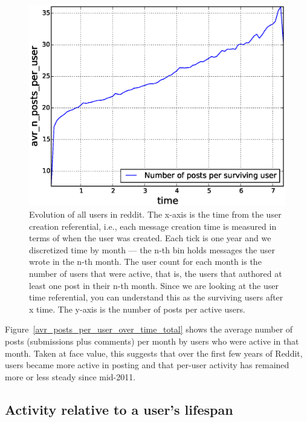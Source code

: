 \begin{figure}[!tb]
\centering
\includegraphics[scale=0.4]{./images/avr_posts_per_user_user_ref_total.eps}
\caption{Evolution of all users in reddit. The x-axis is the time from the user creation referential, i.e., each message creation time is measured in terms of when the user was created. Each tick is one year and we discretized time by month --- the n-th bin holds messages the user wrote in the n-th month. The user count for each month is the number of users that were active, that is, the users that authored at least one post in their n-th month. Since we are looking at the user time referential, you can understand this as the surviving users after x time. The y-axis is the number of posts per active users. }
\label{fig:avr_posts_per_user_user_ref_total}
\end{figure}

Figure~\ref{avr_posts_per_user_over_time_total} shows the average number of posts (submissions plus comments) per month by users who were active in that month.  Taken at face value, this suggests that over the first few years of Reddit, users became more active in posting and that per-user activity has remained more or less steady since mid-2011.  

\subsection{Activity relative to a user's lifespan}


